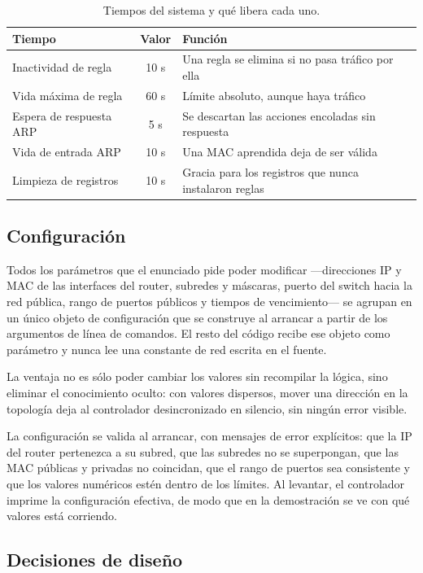 ﻿\documentclass[10pt,a4paper]{article}
\begin{document}
\begin{table}[H]
\centering
\begin{tabular}{lcl}
\toprule
\textbf{Tiempo} & \textbf{Valor} & \textbf{Función} \\
\midrule
Inactividad de regla     & 10 s & Una regla se elimina si no pasa tráfico por ella \\
Vida máxima de regla     & 60 s & Límite absoluto, aunque haya tráfico \\
Espera de respuesta ARP  & 5 s  & Se descartan las acciones encoladas sin respuesta \\
Vida de entrada ARP      & 10 s & Una MAC aprendida deja de ser válida \\
Limpieza de registros    & 10 s & Gracia para los registros que nunca instalaron reglas \\
\bottomrule
\end{tabular}
\caption{Tiempos del sistema y qué libera cada uno.}
\label{tab:tiempos}
\end{table}

\subsection{Configuración}

Todos los parámetros que el enunciado pide poder modificar ---direcciones IP y MAC
de las interfaces del router, subredes y máscaras, puerto del switch hacia la red
pública, rango de puertos públicos y tiempos de vencimiento--- se agrupan en un
único objeto de configuración que se construye al arrancar a partir de los
argumentos de línea de comandos. El resto del código recibe ese objeto como
parámetro y nunca lee una constante de red escrita en el fuente.

La ventaja no es sólo poder cambiar los valores sin recompilar la lógica, sino
eliminar el conocimiento oculto: con valores dispersos, mover una dirección en la
topología deja al controlador desincronizado en silencio, sin ningún error visible.

La configuración se valida al arrancar, con mensajes de error explícitos: que la IP
del router pertenezca a su subred, que las subredes no se superpongan, que las MAC
públicas y privadas no coincidan, que el rango de puertos sea consistente y que los
valores numéricos estén dentro de los límites. Al levantar, el controlador imprime
la configuración efectiva, de modo que en la demostración se ve con qué valores está
corriendo.

\subsection{Decisiones de diseño}
\end{document}
